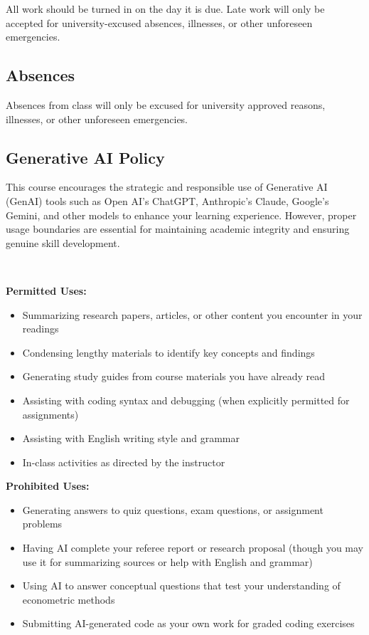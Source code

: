 \documentclass[11pt,english]{article}
\begin{document}
All work should be turned in on the day it is due. Late work will only be accepted for university-excused absences, illnesses, or other unforeseen emergencies.

\subsection*{Absences}

Absences from class will only be excused for university approved reasons, illnesses, or other unforeseen emergencies.

\subsection*{Generative AI Policy}

This course encourages the strategic and responsible use of Generative AI (GenAI) tools such as Open AI's ChatGPT, Anthropic's Claude, Google's Gemini, and other models to enhance your learning experience. However, proper usage boundaries are essential for maintaining academic integrity and ensuring genuine skill development. \par\,\par

\textbf{Permitted Uses:}
\begin{itemize}
    \item Summarizing research papers, articles, or other content you encounter in your readings
    \item Condensing lengthy materials to identify key concepts and findings
    \item Generating study guides from course materials you have already read
    \item Assisting with coding syntax and debugging (when explicitly permitted for assignments)
    \item Assisting with English writing style and grammar
    \item In-class activities as directed by the instructor
\end{itemize}

\textbf{Prohibited Uses:}
\begin{itemize}
    \item Generating answers to quiz questions, exam questions, or assignment problems
    \item Having AI complete your referee report or research proposal (though you may use it for summarizing sources or help with English and grammar)
    \item Using AI to answer conceptual questions that test your understanding of econometric methods
    \item Submitting AI-generated code as your own work for graded coding exercises
\end{itemize}
\end{document}
